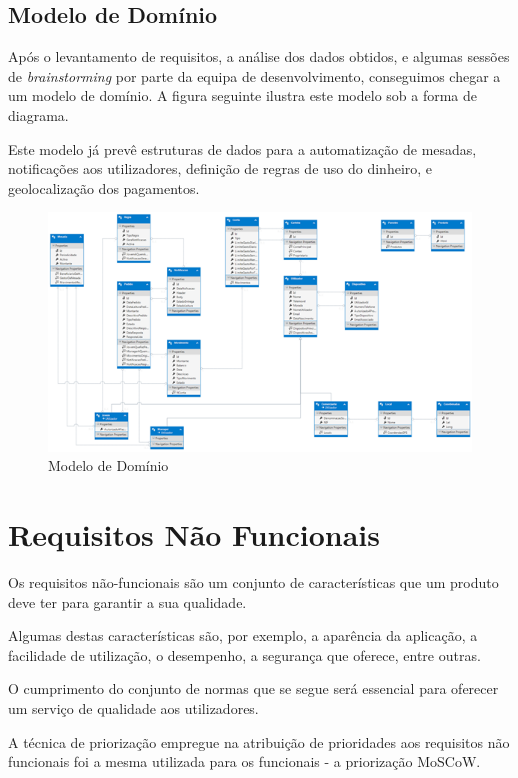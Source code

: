 \documentclass[12pt,a4paper]{article}
\begin{document}
  \subsection{Modelo de Domínio}

    Após o levantamento de requisitos, a análise dos dados obtidos, e algumas sessões de \emph{brainstorming} por parte da equipa de desenvolvimento, conseguimos chegar a um modelo de domínio. A figura seguinte ilustra este modelo sob a forma de diagrama.

    Este modelo já prevê estruturas de dados para a automatização de mesadas, notificações aos utilizadores, definição de regras de uso do dinheiro, e geolocalização dos pagamentos.


      \begin{figure}[ht!]
        \centering
          \includegraphics[width=\linewidth]{img/img14}
          \caption{Modelo de Domínio}
          \label{img14}
      \end{figure}

\newpage

\section{Requisitos Não Funcionais}

  Os requisitos não-funcionais são um conjunto de características que um produto deve ter para garantir a sua qualidade.

  Algumas destas características são, por exemplo, a aparência da aplicação, a facilidade de utilização, o desempenho, a segurança que oferece, entre outras.

  O cumprimento do conjunto de normas que se segue será essencial para oferecer um serviço de qualidade aos utilizadores.
  
  A técnica de priorização empregue na atribuição de prioridades aos requisitos não funcionais foi a mesma utilizada para os funcionais - a priorização MoSCoW.
\end{document}
